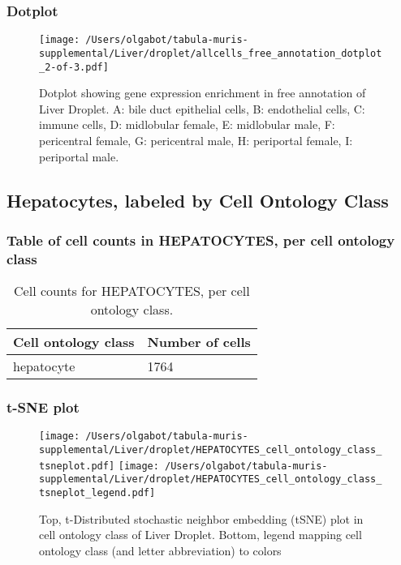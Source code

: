 \newpage
\newpage
\subsubsection{Dotplot}
\begin{figure}[h]
\centering
\texttt{[image: /Users/olgabot/tabula-muris-supplemental/Liver/droplet/allcells\_free\_annotation\_dotplot\_2-of-3.pdf]}

\caption{ Dotplot  showing gene expression enrichment in free annotation of Liver Droplet. A: bile duct epithelial cells, B: endothelial cells, C: immune cells, D: midlobular female, E: midlobular male, F: pericentral female, G: pericentral male, H: periportal female, I: periportal male.}
\end{figure}


\newpage
\subsection{Hepatocytes, labeled by Cell Ontology Class}
\subsubsection{Table of cell counts in HEPATOCYTES, per cell ontology class}\begin{table}[h]
\centering
\label{my-label}
\begin{tabular}{@{}ll@{}}
\toprule

Cell ontology class& Number of cells \\ \midrule
hepatocyte & 1764 \\
\bottomrule
\end{tabular}
\caption{Cell counts for HEPATOCYTES, per cell ontology class.}
\end{table}

\newpage
\subsubsection{t-SNE plot}
\begin{figure}[h]
\centering
\texttt{[image: /Users/olgabot/tabula-muris-supplemental/Liver/droplet/HEPATOCYTES\_cell\_ontology\_class\_tsneplot.pdf]}
\texttt{[image: /Users/olgabot/tabula-muris-supplemental/Liver/droplet/HEPATOCYTES\_cell\_ontology\_class\_tsneplot\_legend.pdf]}
\caption{Top, t-Distributed stochastic neighbor embedding (tSNE) plot  in cell ontology class of Liver Droplet. Bottom, legend mapping cell ontology class (and letter abbreviation) to colors}
\end{figure}


